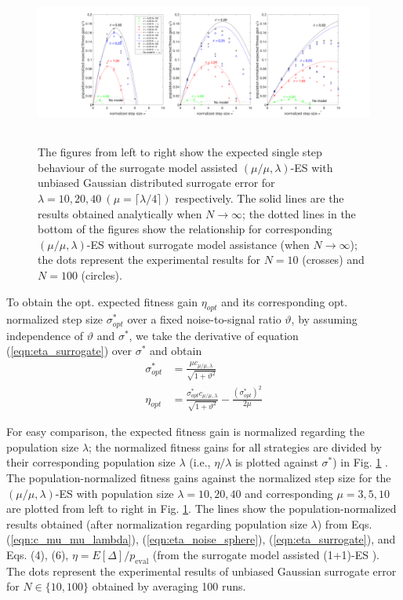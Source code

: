 \begin{center}
\begin{figure}
\includegraphics[height=2.1in, width=6.0in]{expectedFitGain_final_2}
\caption{The figures from left to right show the expected single step behaviour of the surrogate model assisted $(\mu/\mu,\lambda)$-ES with unbiased Gaussian distributed surrogate error for $\lambda=10,20,40\ (\mu = \lceil \lambda/4 \rceil)$ respectively. The solid lines are the results obtained analytically when $N \rightarrow \infty$; the dotted lines in the bottom of the figures show the relationship for corresponding $(\mu/\mu,\lambda)$-ES without surrogate model assistance (when $N\rightarrow \infty$); the dots represent the experimental results for $N=10$ (crosses) and $N=100$ (circles). 
}
\label{fig:expectedFitGain}
\end{figure}
\end{center}

To obtain the opt. expected fitness gain $\eta_{opt}$ and its corresponding opt. normalized step size $\sigma^*_{opt}$ over a fixed noise-to-signal ratio $\vartheta$, by assuming independence of $\vartheta$ and $\sigma^*$, we take the derivative of equation (\ref{eqn:eta_surrogate}) over $\sigma^*$ and obtain
\begin{align}\label{eqn:opt_surrogate}
\sigma^*_{opt} &= \frac{ \mu c_{\mu / \mu, \lambda}}{\sqrt {1+ \vartheta^2}}\\
\eta_{opt} &= \frac{\sigma^*_{opt} c_{\mu / \mu, \lambda}}{\sqrt {1+ \vartheta^2}} - \frac{(\sigma^*_{opt})^2}{2 \mu} 
\end{align}

 For easy comparison, the expected fitness gain is normalized regarding the population size $\lambda$; the normalized fitness gains for all strategies are divided by their corresponding population size $\lambda$ (i.e., $\eta/\lambda$ is plotted against $\sigma^*$) in Fig. \ref{fig:expectedFitGain} . The population-normalized fitness gains against the normalized step size for the $(\mu/\mu,\lambda)$-ES with population size $\lambda=10,20,40$ and corresponding $\mu=3,5,10$ are plotted from left to right in Fig. \ref{fig:expectedFitGain}. The lines show the population-normalized results obtained (after normalization regarding population size $\lambda$) from Eqs. (\ref{eqn:c_mu_mu_lambda}), (\ref{eqn:eta_noise_sphere}), (\ref{eqn:eta_surrogate}), and Eqs. (4), (6), $\eta = E[\Delta]/p_{\text{eval}}$ (from the surrogate model assisted (1+1)-ES \cite{DBLP:conf/ppsn/KayhaniA18}). The dots represent the experimental results of unbiased Gaussian surrogate error for $N \in \{10,100 \}$ obtained by averaging 100 runs. 

